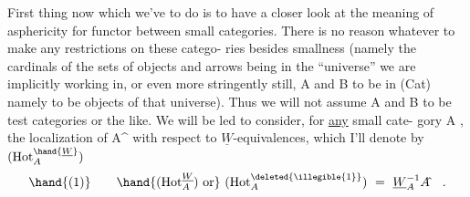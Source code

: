 First thing now which we've to do is to have a closer look at the
meaning of asphericity for  functor between  small categories.  There is
no reason whatever to  make any restrictions on these catego-%
ries besides smallness  (namely the cardinals of the sets of objects and
arrows being in the ``universe'' we are implicitly working in,  or even
more stringently still,  A and B to be in (Cat)  namely to be objects
of that universe).  Thus we will not assume A and B to be test categories
or the like.   We will be led to consider,  for \uline{any} small cate-%
gory A ,  the localization of A\^{} with respect to $\underline{W}$-equivalences,  which
I'll denote by $(\mathrm{Hot}^{\hand{\underline{W}}}_A)$ 
\[ \hand{(1)} \qquad \hand{(\mathrm{Hot}^{\underline{W}}_A)\text{ or}} \ (\mathrm{Hot}^{\deleted{\illegible{1}}}_A) \ = \ \underline{W}_A^{-1}A\hat{} \quad . \]

